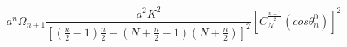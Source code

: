 \begin{equation}
{a^n \Omega_{n+1}}\frac{a^2K^2}{[(\frac{n}{2}-1)\frac{n}{2} - (N+\frac{n}{2}-1)(N+\frac{n}{2})]^2}[C_N^{\frac{n-1}{2}}(cos{\theta_n^0})]^2
\end{equation}


